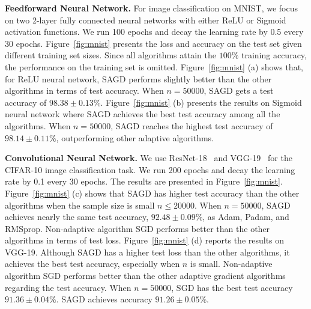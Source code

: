 \documentclass[11pt]{article}
\begin{document}
\textbf{Feedforward Neural Network.}
For image classification on MNIST, we focus on two 2-layer fully connected neural networks with either ReLU or Sigmoid activation functions. 
We run 100 epochs and decay the learning rate by 0.5 every 30 epochs. 
Figure~\ref{fig:mnist} presents the loss and accuracy on the test set given different training set sizes. 
Since all algorithms attain the $100\%$ training accuracy, the performance on the training set is omitted. 
Figure~\ref{fig:mnist} (a) shows that, for ReLU neural network, \textsc{SAGD} performs slightly better than the other algorithms in terms of test accuracy. When $n =50000$, \textsc{SAGD} gets a test accuracy of $98.38 \pm 0.13 \%$. 
Figure~\ref{fig:mnist} (b) presents the results on Sigmoid neural network where \textsc{SAGD} achieves the best test accuracy among all the algorithms. When $n =50000$, \textsc{SAGD} reaches the highest test accuracy of $98.14 \pm 0.11 \%$, outperforming other adaptive algorithms.


\textbf{Convolutional Neural Network.}
We use ResNet-18~\citep{hezh2016} and VGG-19~\citep{sizi2014} for the CIFAR-10 image classification task. 
We run 200 epochs and decay the learning rate by 0.1 every 30 epochs. 
The results are presented in Figure~\ref{fig:mnist}. 
Figure~\ref{fig:mnist} (c) shows that \textsc{SAGD} has higher test accuracy than the 
other algorithms when the sample size is small \ie $n \leq 20000$.
When $n = 50000$, \textsc{SAGD} achieves nearly the same test accuracy, $92.48 \pm 0.09\%$,  as Adam, Padam, and RMSprop.
Non-adaptive algorithm SGD performs better than the other algorithms in terms of test loss. 
Figure~\ref{fig:mnist} (d) reports the results on VGG-19. Although \textsc{SAGD} has a higher test loss than the other algorithms, it achieves the best test accuracy, especially when $n$ is small. Non-adaptive algorithm SGD performs better than the other adaptive gradient algorithms regarding the test accuracy.
When $n= 50000$, SGD has the best test accuracy $91.36 \pm 0.04\%$. \textsc{SAGD} achieves accuracy $91.26 \pm 0.05\%$.
\end{document}
